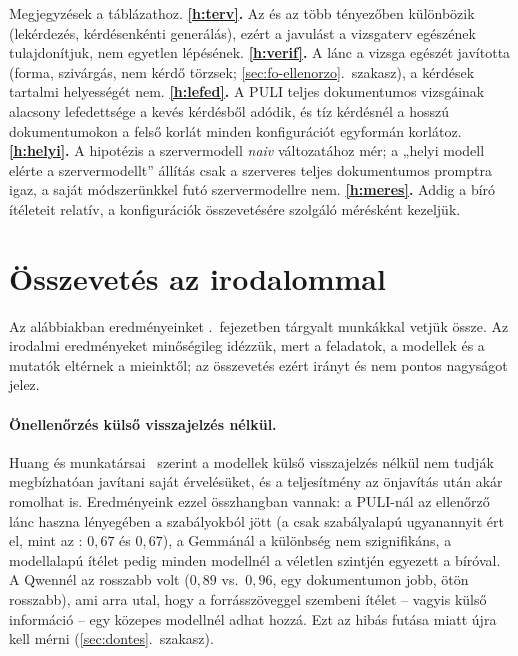 Megjegyzések a táblázathoz. \textbf{\ref{h:terv}.} Az  és
az  több tényezőben különbözik (lekérdezés, kérdésenkénti generálás), ezért a javulást a vizsgaterv
egészének tulajdonítjuk, nem egyetlen lépésének. \textbf{\ref{h:verif}.} A lánc a vizsga egészét javította
(forma, szivárgás, nem kérdő törzsek; \ref{sec:fo-ellenorzo}.~szakasz), a kérdések tartalmi helyességét nem.
\textbf{\ref{h:lefed}.} A PULI teljes dokumentumos vizsgáinak alacsony lefedettsége a kevés kérdésből
adódik, és tíz kérdésnél a hosszú dokumentumokon a felső korlát minden konfigurációt egyformán korlátoz.
\textbf{\ref{h:helyi}.} A hipotézis a szervermodell \emph{naiv} változatához mér; a „helyi modell elérte a
szervermodellt” állítás csak a szerveres teljes dokumentumos promptra igaz, a saját módszerünkkel futó
szervermodellre nem. \textbf{\ref{h:meres}.} Addig a bíró ítéleteit relatív, a konfigurációk összevetésére
szolgáló mérésként kezeljük. 

\section{Összevetés az irodalommal}
\label{sec:irod-osszevetes}

Az alábbiakban eredményeinket \az{\ref{ch:szakirodalom}}.~fejezetben tárgyalt munkákkal vetjük össze. Az
irodalmi eredményeket minőségileg idézzük, mert a feladatok, a modellek és a mutatók eltérnek a mieinktől;
az összevetés ezért irányt és nem pontos nagyságot jelez.

\paragraph{Önellenőrzés külső visszajelzés nélkül.} Huang és munkatársai~\cite{huang2024selfcorrect} szerint
a modellek külső visszajelzés nélkül nem tudják megbízhatóan javítani saját érvelésüket, és a
teljesítmény az önjavítás után akár romolhat is. Eredményeink ezzel összhangban vannak: a PULI-nál az
ellenőrző lánc haszna lényegében a szabályokból jött (a csak szabályalapú  ugyanannyit ért el, mint
az : $0{,}67$ és $0{,}67$), a Gemmánál a különbség nem szignifikáns, a modellalapú ítélet pedig minden
modellnél a véletlen szintjén egyezett a bíróval. A Qwennél az  rosszabb volt ($0{,}89$ vs.\
$0{,}96$, egy dokumentumon jobb, ötön rosszabb), ami arra utal, hogy a forrásszöveggel szembeni ítélet --
vagyis külső információ -- egy közepes modellnél adhat hozzá. Ezt az \arm{E2x} hibás futása miatt újra kell
mérni (\ref{sec:dontes}.~szakasz).

